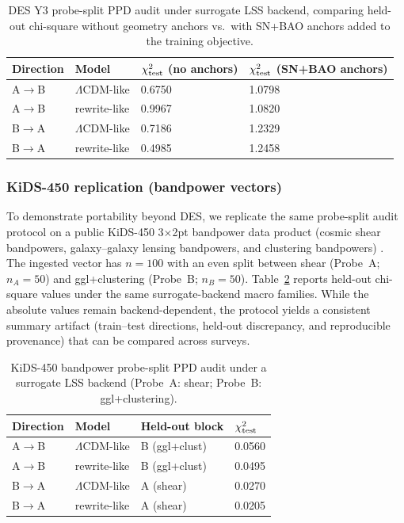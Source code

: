 \documentclass[11pt]{article}
\theoremstyle{definition}
\theoremstyle{plain}
\theoremstyle{remark}
\begin{document}
\begin{table}[t]
\centering
\caption{DES Y3 probe-split PPD audit under surrogate LSS backend, comparing held-out chi-square without geometry anchors vs.\ with SN+BAO anchors added to the training objective.}
\label{tab:lss_ppd_y3_anchors}
\begin{tabular}{@{}llll@{}}
\toprule
Direction & Model & $\chi^2_{\rm test}$ (no anchors) & $\chi^2_{\rm test}$ (SN+BAO anchors) \\
\midrule
A$\to$B & $\Lambda$CDM-like & 0.6750 & 1.0798 \\
A$\to$B & rewrite-like & 0.9967 & 1.0820 \\
B$\to$A & $\Lambda$CDM-like & 0.7186 & 1.2329 \\
B$\to$A & rewrite-like & 0.4985 & 1.2458 \\
\bottomrule
\end{tabular}
\end{table}

\subsubsection{KiDS-450 replication (bandpower vectors)}\label{sec:results:lss_kids}
To demonstrate portability beyond DES, we replicate the same probe-split audit protocol on a public KiDS-450 3$\times$2pt bandpower data product (cosmic shear bandpowers, galaxy--galaxy lensing bandpowers, and clustering bandpowers) \cite{vanUitert2018KiDSGAMA,KiDSDataProducts}.
The ingested vector has $n=100$ with an even split between shear (Probe~A; $n_A=50$) and ggl+clustering (Probe~B; $n_B=50$).
Table~\ref{tab:lss_ppd_kids} reports held-out chi-square values under the same surrogate-backend macro families.
While the absolute values remain backend-dependent, the protocol yields a consistent summary artifact (train--test directions, held-out discrepancy, and reproducible provenance) that can be compared across surveys.

\begin{table}[t]
\centering
\caption{KiDS-450 bandpower probe-split PPD audit under a surrogate LSS backend (Probe~A: shear; Probe~B: ggl+clustering).}
\label{tab:lss_ppd_kids}
\begin{tabular}{@{}llll@{}}
\toprule
Direction & Model & Held-out block & $\chi^2_{\rm test}$ \\
\midrule
A$\to$B & $\Lambda$CDM-like & B (ggl+clust) & 0.0560 \\
A$\to$B & rewrite-like & B (ggl+clust) & 0.0495 \\
B$\to$A & $\Lambda$CDM-like & A (shear) & 0.0270 \\
B$\to$A & rewrite-like & A (shear) & 0.0205 \\
\bottomrule
\end{tabular}
\end{table}
\end{document}
